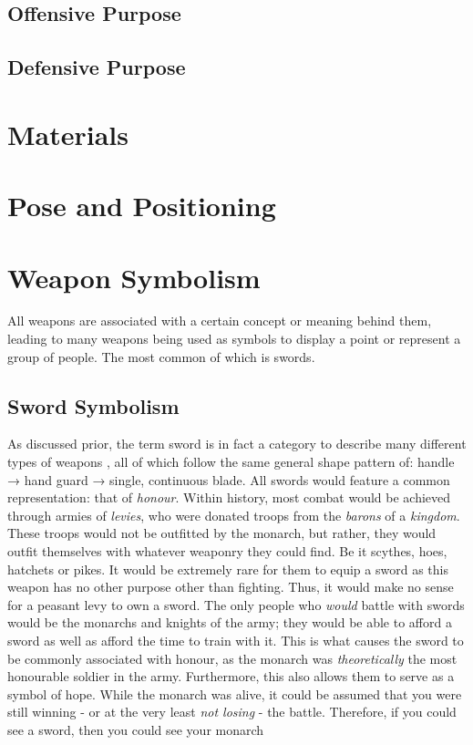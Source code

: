 \documentclass{article}
\begin{document}
\subsection{Offensive Purpose}

\subsection{Defensive Purpose}

\pagebreak

\section{Materials}

\pagebreak
\section{Pose and Positioning}



\pagebreak

\section{Weapon Symbolism}
All weapons are associated with a certain concept or meaning behind them, leading to many weapons being used as symbols to display a point or represent a group of people. The most common of which is swords.
\subsection{Sword Symbolism} \label{swordSymbol}
As discussed prior, the term sword is in fact a category to describe many different types of weapons \parencite{furat1998brief}, all of which follow the same general shape pattern of: handle → hand guard → single, continuous blade.
All swords would feature a common representation: that of \emph{honour}. Within history, most combat would be achieved through armies of \emph{levies}, who were donated troops from the \emph{barons} of a \emph{kingdom}. These troops would not be outfitted by the monarch, but rather, they would outfit themselves with whatever weaponry they could find. Be it scythes, hoes, hatchets or pikes. It would be extremely rare for them to equip a sword as this weapon has no other purpose other than fighting. Thus, it would make no sense for a peasant levy to own a sword. The only people who \emph{would} battle with swords would be the monarchs and knights of the army; they would be able to afford a sword as well as afford the time to train with it. This is what causes the sword to be commonly associated with honour, as the monarch was \textit{theoretically} the most honourable soldier in the army. Furthermore, this also allows them to serve as a symbol of hope. While the monarch was alive, it could be assumed that you were still winning - or at the very least \emph{not losing} - the battle. Therefore, if you could see a sword, then you could see your monarch
\end{document}
